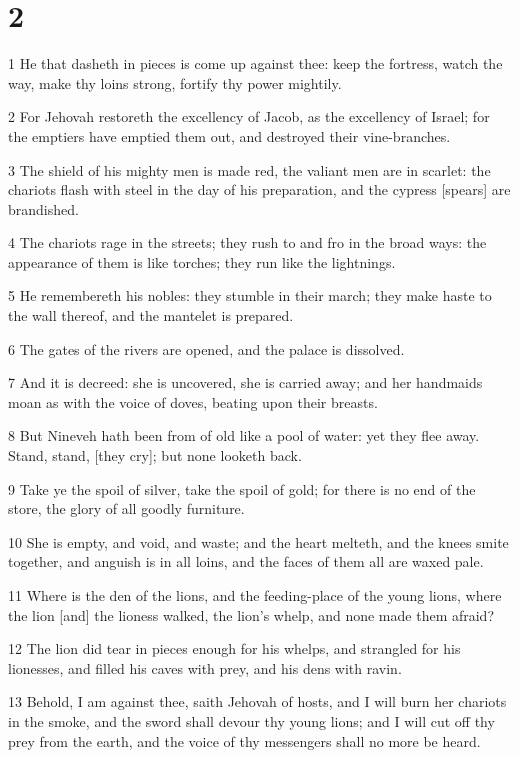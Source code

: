 \chapter{2}

\par 1 He that dasheth in pieces is come up against thee: keep the fortress, watch the way, make thy loins strong, fortify thy power mightily.
\par 2 For Jehovah restoreth the excellency of Jacob, as the excellency of Israel; for the emptiers have emptied them out, and destroyed their vine-branches.
\par 3 The shield of his mighty men is made red, the valiant men are in scarlet: the chariots flash with steel in the day of his preparation, and the cypress [spears] are brandished.
\par 4 The chariots rage in the streets; they rush to and fro in the broad ways: the appearance of them is like torches; they run like the lightnings.
\par 5 He remembereth his nobles: they stumble in their march; they make haste to the wall thereof, and the mantelet is prepared.
\par 6 The gates of the rivers are opened, and the palace is dissolved.
\par 7 And it is decreed: she is uncovered, she is carried away; and her handmaids moan as with the voice of doves, beating upon their breasts.
\par 8 But Nineveh hath been from of old like a pool of water: yet they flee away. Stand, stand, [they cry]; but none looketh back.
\par 9 Take ye the spoil of silver, take the spoil of gold; for there is no end of the store, the glory of all goodly furniture.
\par 10 She is empty, and void, and waste; and the heart melteth, and the knees smite together, and anguish is in all loins, and the faces of them all are waxed pale.
\par 11 Where is the den of the lions, and the feeding-place of the young lions, where the lion [and] the lioness walked, the lion's whelp, and none made them afraid?
\par 12 The lion did tear in pieces enough for his whelps, and strangled for his lionesses, and filled his caves with prey, and his dens with ravin.
\par 13 Behold, I am against thee, saith Jehovah of hosts, and I will burn her chariots in the smoke, and the sword shall devour thy young lions; and I will cut off thy prey from the earth, and the voice of thy messengers shall no more be heard.

